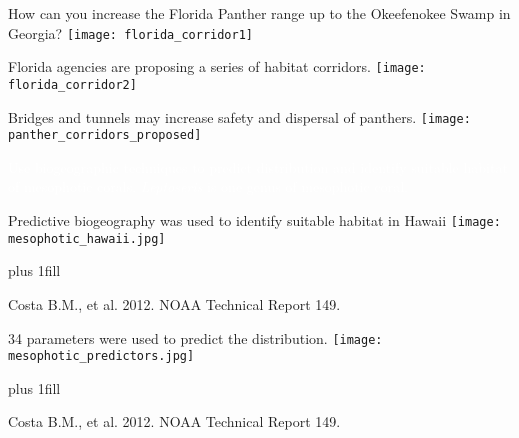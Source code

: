 \documentclass[t]{beamer}
\begin{document}
{
\begin{frame}[plain]
\end{frame}
}

\begin{frame}[plain]{How can you increase the Florida Panther range up to the Okeefenokee Swamp in Georgia?}
	\centering%
		\texttt{[image: florida\_corridor1]}
\end{frame}

\begin{frame}[plain]{Florida agencies are proposing a series of habitat corridors.}
	\centering%
		\texttt{[image: florida\_corridor2]}
\end{frame}


\begin{frame}[plain]{Bridges and tunnels may increase safety and dispersal of panthers.}
	\centering%
		\texttt{[image: panther\_corridors\_proposed]}
\end{frame}

{
\begin{frame}[b,plain]{\textcolor{white}{Use biogeographic techniques to predict distribution and identify suitable habitat of mesophotic corals.}}
\hfill \textcolor{white}{\textit{Leptoseris} is one genus of mesophotic coral.}
\end{frame}
}

\begin{frame}[t,plain]{Predictive biogeography was used to identify suitable habitat in Hawaii}
	\centering%
		\texttt{[image: mesophotic\_hawaii.jpg]}\par
		
	\vskip0pt plus 1fill
		
\hfill\tiny Costa B.M., et al. 2012. NOAA Technical Report 149.
\end{frame}

\begin{frame}[t,plain]{34 parameters were used to predict the distribution.}
	\centering%
		\texttt{[image: mesophotic\_predictors.jpg]}\par

	\vskip0pt plus 1fill

\hfill\tiny Costa B.M., et al. 2012. NOAA Technical Report 149.
\end{frame}
\end{document}
